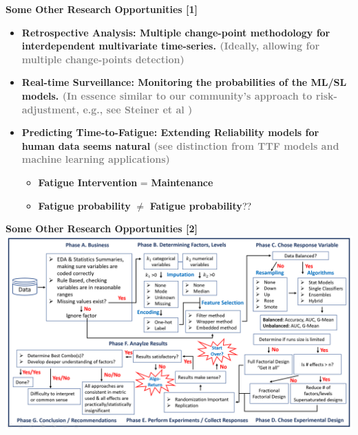 \documentclass[aspectratio=43]{beamer}
\begin{document}
\begin{frame}{\textbf{Some Other Research Opportunities [1]}}
\begin{dBox}
\begin{itemize}
    \item<1> \textbf{\textcolor{miamired}{Retrospective Analysis:} Multiple change-point methodology for interdependent multivariate time-series. \textcolor{gray}{(Ideally, allowing for multiple change-points detection)}}
    
    \item<2>\textbf{\textcolor{miamired}{Real-time Surveillance:} Monitoring the probabilities of the ML/SL models. \textcolor{gray}{(In essence similar to our community's approach to risk-adjustment, e.g., see Steiner et al \cite{steiner2000monitoring})}}
    
    \item<3-5> \textbf{\textcolor{miamired}{Predicting Time-to-Fatigue:} Extending Reliability models for human data seems natural \textcolor{gray}{(see distinction from TTF models and machine learning applications)}}
    \begin{itemize}
        \item<4> \textbf{Fatigue Intervention} = \textbf{Maintenance}
        \item<5> \textbf{Fatigue probability} $\ne$ \textbf{Fatigue probability}??
    \end{itemize}
    
\end{itemize}
    
\end{dBox}
    
\end{frame}

\begin{frame}{\textbf{Some Other Research Opportunities [2]}}
    \centering
    \includegraphics[width=\textwidth]{Figures/jmeaehpgoaglbpdo.png}
\end{frame}
\end{document}
